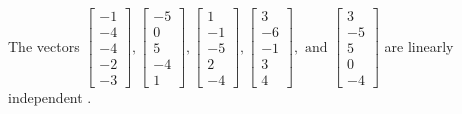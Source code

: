 \begin{exercise}
\begin{exerciseStatement}
  \end{exerciseStatement}
  \begin{exerciseAnswer}
   The vectors \(\left[\begin{array}{r}
-1 \\
-4 \\
-4 \\
-2 \\
-3
\end{array}\right] , \left[\begin{array}{r}
-5 \\
0 \\
5 \\
-4 \\
1
\end{array}\right] , \left[\begin{array}{r}
1 \\
-1 \\
-5 \\
2 \\
-4
\end{array}\right] , \left[\begin{array}{r}
3 \\
-6 \\
-1 \\
3 \\
4
\end{array}\right] , \text{ and } \left[\begin{array}{r}
3 \\
-5 \\
5 \\
0 \\
-4
\end{array}\right]\) are 
  	 linearly independent  .
  


  \end{exerciseAnswer}
\end{exercise}